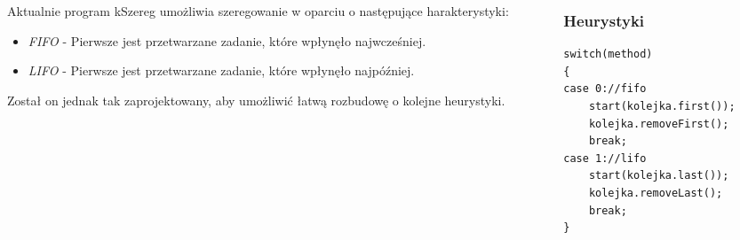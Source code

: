 \documentclass{prezentacja}
\begin{document}
\begin{frame}[fragile]
    \begin{columns}
        \begin{column}{.55\textwidth}
            \footnotesize
            Aktualnie program kSzereg umożliwia szeregowanie w oparciu o następujące harakterystyki:
            \begin{itemize}
                \normalsize
                \item\emph{FIFO} - Pierwsze jest przetwarzane zadanie, które wpłynęło najwcześniej\cite{jobSlack}.
                \item\emph{LIFO} - Pierwsze jest przetwarzane zadanie, które wpłynęło najpóźniej\cite{jobSlack}.
            \end{itemize}
            Został on jednak tak zaprojektowany, aby umożliwić łatwą rozbudowę o kolejne heurystyki. 
        \end{column}
        \begin{column}{.45\textwidth}
            \frametitle{Heurystyki}
            \begin{lstlisting}
switch(method)
{
case 0://fifo
    start(kolejka.first());
    kolejka.removeFirst();
    break;
case 1://lifo
    start(kolejka.last());
    kolejka.removeLast();
    break;
}
            \end{lstlisting}
        \end{column}
    \end{columns}
\end{frame}
\end{document}
